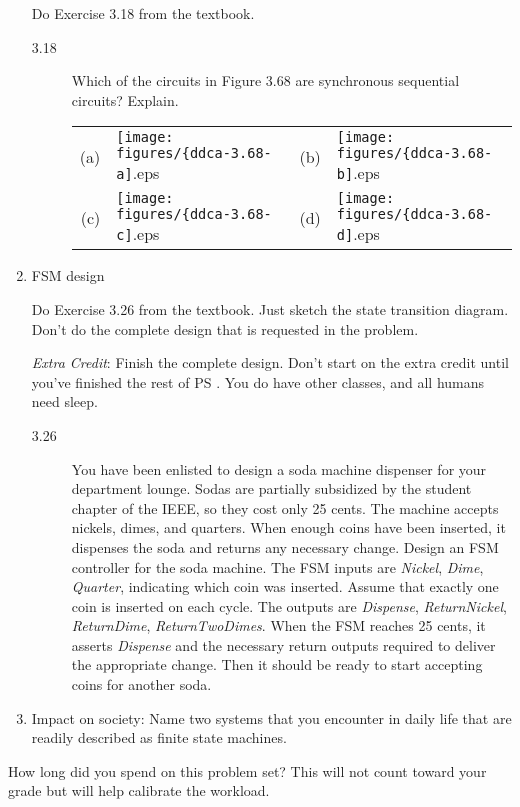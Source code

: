 \documentclass{e85}
\begin{document}
\begin{enumerate}
  Do Exercise 3.18 from the textbook.
  \begin{description}
  \item[3.18] Which of the circuits in Figure 3.68 are synchronous
    sequential circuits?  Explain.
    \begin{center}
      \begin{tabu}{rl@{\qquad}rl}
        (a)&\texttt{[image: figures/\{ddca-3.68-a]}.eps}&
        (b)&\texttt{[image: figures/\{ddca-3.68-b]}.eps}\\[1em]
        (c)&\texttt{[image: figures/\{ddca-3.68-c]}.eps}&
        (d)&\texttt{[image: figures/\{ddca-3.68-d]}.eps}
      \end{tabu}
    \end{center}
    \begin{solution}
    \end{solution}
  \end{description}

\item FSM design

  Do Exercise 3.26 from the textbook.  Just sketch the state
  transition diagram.  Don't do the complete design that is requested
  in the problem.

  \textit{Extra Credit}: Finish the complete design.  Don't start on
  the extra credit until you've finished the rest of PS \theps.  You
  do have other classes, and all humans need sleep.
  \begin{description}
  \item[3.26] You have been enlisted to design a soda machine
    dispenser for your department lounge.  Sodas are partially
    subsidized by the student chapter of the IEEE, so they cost only
    25 cents.  The machine accepts nickels, dimes, and quarters.  When
    enough coins have been inserted, it dispenses the soda and returns
    any necessary change.  Design an FSM controller for the soda
    machine.  The FSM inputs are \textit{Nickel}, \textit{Dime},
    \textit{Quarter}, indicating which coin was inserted.  Assume that
    exactly one coin is inserted on each cycle.  The outputs are
    \textit{Dispense}, \textit{ReturnNickel}, \textit{ReturnDime},
    \textit{ReturnTwoDimes}.  When the FSM reaches 25 cents, it
    asserts \textit{Dispense} and the necessary return outputs
    required to deliver the appropriate change.  Then it should be
    ready to start accepting coins for another soda.
    \begin{solution}
    \end{solution}
  \end{description}

\item Impact on society: Name two systems that you encounter in daily
  life that are readily described as finite state machines.
  \begin{solution}
  \end{solution}
\end{enumerate}

How long did you spend on this problem set?  This will not count
toward your grade but will help calibrate the workload.
\begin{solution}
\end{solution}
\end{document}
